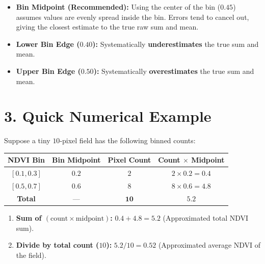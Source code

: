 \documentclass[11pt,a4paper]{article}
\begin{document}
\begin{itemize}[leftmargin=1.5em]
    \item \textbf{Bin Midpoint (Recommended):} Using the center of the bin ($0.45$) assumes values are evenly spread inside the bin. Errors tend to cancel out, giving the closest estimate to the true raw sum and mean.
    \item \textbf{Lower Bin Edge ($0.40$):} Systematically \textbf{underestimates} the true sum and mean.
    \item \textbf{Upper Bin Edge ($0.50$):} Systematically \textbf{overestimates} the true sum and mean.
\end{itemize}

\section*{3. Quick Numerical Example}

Suppose a tiny $10$-pixel field has the following binned counts:

\begin{center}
\begin{tabular}{@{}cccc@{}}
\toprule
\textbf{NDVI Bin} & \textbf{Bin Midpoint} & \textbf{Pixel Count} & \textbf{Count $\times$ Midpoint} \\
\midrule
$[0.1, 0.3]$ & $0.2$ & $2$ & $2 \times 0.2 = 0.4$ \\
$[0.5, 0.7]$ & $0.6$ & $8$ & $8 \times 0.6 = 4.8$ \\
\midrule
\textbf{Total} & --- & $\mathbf{10}$ & $\mathbf{5.2}$ \\
\bottomrule
\end{tabular}
\end{center}

\begin{enumerate}[leftmargin=1.5em]
    \item \textbf{Sum of $(\text{count} \times \text{midpoint})$:} $0.4 + 4.8 = \mathbf{5.2}$ (Approximated total NDVI sum).
    \item \textbf{Divide by total count ($10$):} $5.2 / 10 = \mathbf{0.52}$ (Approximated average NDVI of the field).
\end{enumerate}
\end{document}
